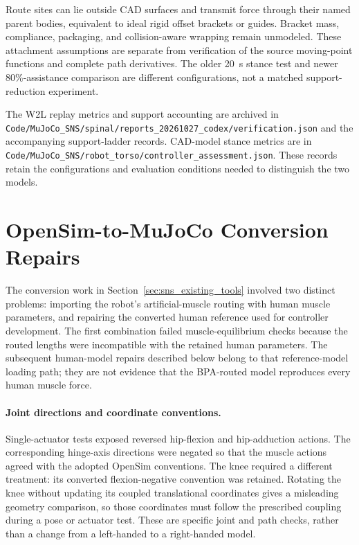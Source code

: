 Route sites can lie outside CAD surfaces and transmit force through their named parent bodies, equivalent to ideal rigid offset brackets or guides. Bracket mass, compliance, packaging, and collision-aware wrapping remain unmodeled. These attachment assumptions are separate from verification of the source moving-point functions and complete path derivatives. The older \qty{20}{\second} stance test and newer 80\%-assistance comparison are different configurations, not a matched support-reduction experiment.

The W2L replay metrics and support accounting are archived in \nolinkurl{Code/MuJoCo_SNS/spinal/reports_20261027_codex/verification.json} and the accompanying support-ladder records. CAD-model stance metrics are in \nolinkurl{Code/MuJoCo_SNS/robot_torso/controller_assessment.json}. These records retain the configurations and evaluation conditions needed to distinguish the two models.


\section{OpenSim-to-MuJoCo Conversion Repairs}\label{sec:app_conversion_repairs}

The conversion work in Section~\ref{sec:sns_existing_tools} involved two distinct problems: importing the robot's artificial-muscle routing with human muscle parameters, and repairing the converted human reference used for controller development. The first combination failed muscle-equilibrium checks because the routed lengths were incompatible with the retained human parameters. The subsequent human-model repairs described below belong to that reference-model loading path; they are not evidence that the BPA-routed model reproduces every human muscle force.

\paragraph{Joint directions and coordinate conventions.}
Single-actuator tests exposed reversed hip-flexion and hip-adduction actions. The corresponding hinge-axis directions were negated so that the muscle actions agreed with the adopted OpenSim conventions. The knee required a different treatment: its converted flexion-negative convention was retained. Rotating the knee without updating its coupled translational coordinates gives a misleading geometry comparison, so those coordinates must follow the prescribed coupling during a pose or actuator test. These are specific joint and path checks, rather than a change from a left-handed to a right-handed model.

